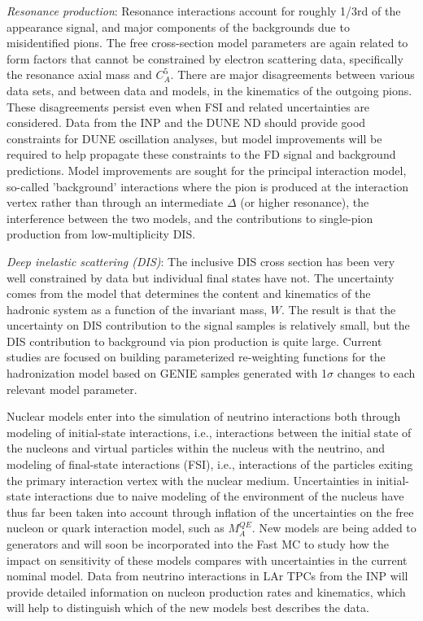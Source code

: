   \emph{Resonance production}: Resonance interactions account for roughly 1/3rd of the \nue appearance
  signal, and major components of the backgrounds due to misidentified pions. The free cross-section model
  parameters are again related to form factors that cannot be constrained by electron
  scattering data, specifically the resonance axial mass and $C^{5}_{A}$. 
  There are major disagreements between various data sets, and between data and models, in the 
  kinematics of the outgoing pions. These disagreements persist even when FSI and related uncertainties
  are considered. Data from the INP and the DUNE ND should provide good constraints for DUNE
  oscillation analyses, but model improvements will be required to help propagate these constraints
  to the FD signal and background predictions. Model improvements are sought for the principal interaction
  model, so-called 'background' interactions where the pion is produced at the interaction vertex 
  rather than through an intermediate $\Delta$ (or higher resonance), the interference between the two
  models, and the contributions to single-pion production from low-multiplicity DIS.

  \emph{Deep inelastic scattering (DIS)}: The inclusive DIS cross section has been very well constrained by 
  data but individual final states have not. The uncertainty comes from the model that determines the
  content and kinematics of the hadronic system as a function of the invariant mass, $W$. The result is that
  the uncertainty on DIS contribution to the signal samples is relatively small, but the DIS contribution to
  background via pion production is quite large. Current studies are focused on building parameterized re-weighting 
  functions for the hadronization model based on GENIE samples generated with 1$\sigma$ changes to each relevant 
  model parameter.

Nuclear models enter into the simulation of neutrino interactions both through modeling of initial-state interactions,
i.e., interactions between the initial state of the nucleons and virtual particles within the nucleus with
the neutrino, and modeling of final-state interactions (FSI), i.e., interactions of the particles exiting the
primary interaction vertex with the nuclear medium. Uncertainties in initial-state interactions due to
naive modeling of the environment of the nucleus have thus far been taken into account through inflation
of the uncertainties on the free nucleon or quark interaction
model, such as $M_{A}^{QE}$. New models are being added to generators and will soon be incorporated into the Fast MC
to study how the impact on sensitivity of these models compares with uncertainties in the current nominal model.
Data from neutrino interactions in LAr TPCs from the INP will provide detailed information on nucleon production
rates and kinematics, which will help to distinguish which of the new models best describes the data.

